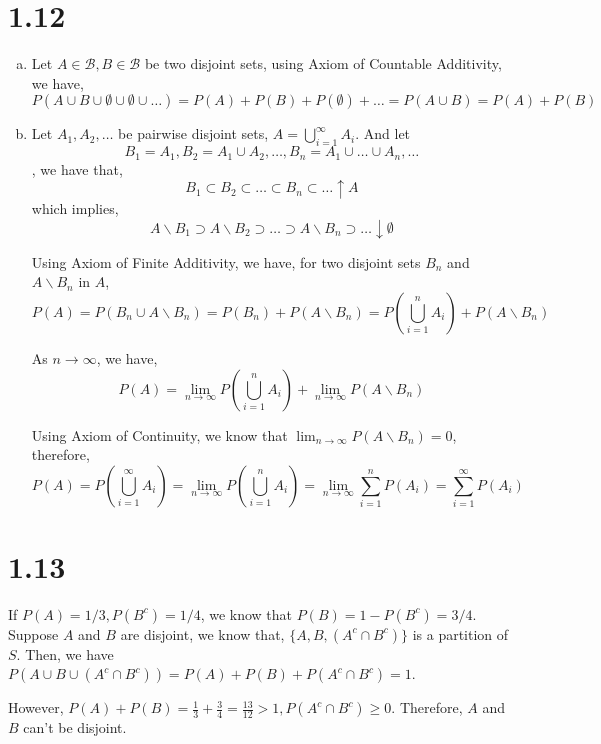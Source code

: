 \documentclass[letter]{article}
\begin{document}
    \section*{1.12}
    \begin{enumerate}[(a)]
    \item Let $A \in \mathcal{B}, B \in \mathcal{B}$ be two disjoint sets, using Axiom of Countable
    Additivity, we have,
    \[
    P(A \cup B \cup \emptyset \cup \emptyset \cup \dots) = P(A) + P(B) + P(\emptyset) + \dots = P(A \cup B) = P(A) + P(B)
    \]
    \item Let $A_1, A_2, \dots$ be pairwise disjoint sets, $A = \bigcup_{i=1}^{\infty} A_i$. And let 
    \[
    B_1 = A_1, B_2 = A_1 \cup A_2, \dots, B_n = A_1 \cup \dots \cup A_n, \dots
    \], we have that,
    \[
    B_1 \subset B_2 \subset \dots \subset B_n \subset \dots \uparrow A
    \]
    which implies,
    \[
    A \backslash B_1 \supset A \backslash B_2 \supset \dots \supset A
    \backslash B_n \supset \dots \downarrow \emptyset
    \]

    Using Axiom of Finite Additivity, we have, for two disjoint sets $B_n$ and
    $A \backslash B_n$ in $A$,
    \[
    P(A) = P\left(B_n \cup A \backslash B_n\right) = P(B_n) + P(A \backslash
    B_n) = P(\bigcup_{i=1}^n A_i) + P(A \backslash B_n)
    \]

    As $n \to \infty$, we have,
    \[
    P(A) = \lim_{n \to \infty} P(\bigcup_{i=1}^n A_i) + \lim_{n \to \infty} P(A
    \backslash B_n)
    \]

    Using Axiom of Continuity, we know that $\lim_{n \to \infty} P(A \backslash B_n) = 0$, therefore,
    \[
    P(A) = P(\bigcup_{i=1}^{\infty} A_i) = \lim_{n \to \infty} P(\bigcup_{i=1}^n A_i) = \lim_{n \to \infty} \sum_{i=1}^n P(A_i) 
    = \sum_{i=1}^{\infty} P(A_i)
    \]

    \end{enumerate}
    \section*{1.13}
    If $P(A) = 1/3, P(B^c) = 1/4$, we know that $P(B) = 1 - P(B^c) = 3/4$. 
    Suppose $A$ and $B$ are disjoint, we know that, $\{A, B, (A^c \cap B^c)\}$ is a partition of $S$.
    Then, we have $P\left(A \cup B \cup (A^c \cap B^c) \right) = P(A) + P(B) + P(A^c \cap B^c) = 1$.

    However, $P(A) + P(B) = \frac{1}{3} + \frac{3}{4} = \frac{13}{12} > 1, P(A^c \cap B^c) \geq 0$. 
    Therefore, $A$ and $B$ can't be disjoint.
\end{document}
